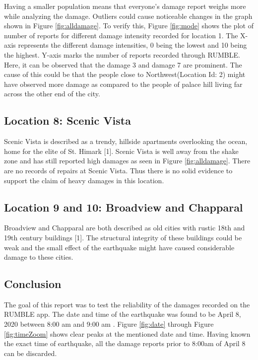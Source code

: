 \documentclass[12pt]{extarticle}
\begin{document}
Having a smaller population means that everyone's damage report weighs more while analyzing the damage. Outliers could cause noticeable changes in the graph shown in Figure \ref{fig:alldamage}. To verify this, Figure \ref{fig:mode} shows the plot of number of reports for different damage intensity recorded for location 1. The X-axis represents the different damage intensities, 0 being the lowest and 10 being the highest. Y-axis marks the number of reports recorded through RUMBLE. \\

Here, it can be observed that the damage 3 and damage 7 are prominent. The cause of this could be that the people close to Northwest(Location Id: 2) might have observed more damage as compared to the people of palace hill living far across the other end of the city.  

\subsection{Location 8: Scenic Vista}
Scenic Vista is described as a trendy, hillside apartments overlooking the ocean, home for the elite of St. Himark [1]. Scenic Vista is well away from the shake zone and has still reported high damages as seen in Figure \ref{fig:alldamage}. There are no records of repairs at Scenic Vista. Thus there is no solid evidence to support the claim of heavy damages in this location.

\subsection{Location 9 and 10: Broadview and Chapparal}
Broadview and Chapparal are both described as old cities with rustic 18th and 19th century buildings [1]. The structural integrity of these buildings could be weak and the small effect of the earthquake might have caused considerable damage to these cities. 

\begin{centering}
	\section{Conclusion}
\end{centering}

The goal of this report was to test the reliability of the damages recorded on the RUMBLE app. The date and time of the earthquake was found to be April 8, 2020 between 8:00 am and 9:00 am . Figure \ref{fig:date} through Figure \ref{fig:timeZoom} shows clear peaks at the mentioned date and time. Having known the exact time of earthquake, all the damage reports prior to 8:00am of April 8 can be discarded. \\
\end{document}
